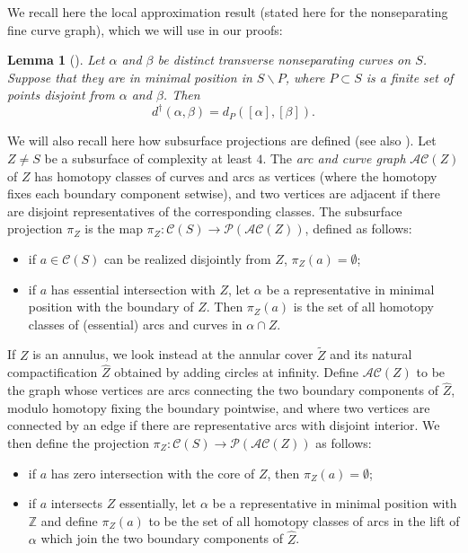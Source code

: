 \documentclass{amsart}
\newcommand{\Z}{\mathbb{Z}}
\newcommand{\C}{\mathcal{C}}
\newcommand{\ssm}{\smallsetminus}
\newcommand{\dist}{d}
\newcommand{\distdagger}{d^\dagger}
\newcommand{\AC}{\mathcal{AC}}
\newtheorem{lemma}[thm]{Lemma}
\theoremstyle{definition}
\begin{document}
We recall here the local approximation result \cite[Lemma 3.4]{bhw_quasi} (stated here for the nonseparating fine curve graph), which we will use in our proofs:

\begin{lemma}[\cite{bhw_quasi}]\label{lem:local-approximation} 
Let \(\alpha\) and \(\beta\) be distinct transverse nonseparating curves on \(S\). Suppose  that they are in minimal position in \(S\ssm P\), where \(P\subset S\) is a finite set of points disjoint from \(\alpha\) and \(\beta\). Then
\[\distdagger(\alpha,\beta)=\dist_P([\alpha],[\beta]).\]
\end{lemma}

We will also recall here how subsurface projections are defined (see also \cite{mm_geometryII}). Let \(Z \neq S\) be a subsurface of complexity at least \(4\). The \emph{arc and curve graph} \(\AC(Z)\) of \(Z\) has homotopy classes of curves and arcs as vertices (where the homotopy fixes each boundary component setwise), and two vertices are adjacent if there are disjoint representatives of the corresponding classes. The subsurface projection \(\pi_Z\) is the map \(\pi_Z:\C(S)\to\mathcal{P}(\AC(Z))\), defined as follows:
\begin{itemize}
\item if \(a\in \C(S)\) can be realized disjointly from \(Z\), \(\pi_Z(a)=\emptyset\);
\item if \(a\) has essential intersection with \(Z\), let \(\alpha\) be a representative in minimal position with the boundary of \(Z\). Then \(\pi_Z(a)\) is the set of all homotopy classes of (essential) arcs and curves in \(\alpha\cap Z\).
\end{itemize}

If \(Z\) is an annulus, we look instead at the annular cover \(\tilde{Z}\) and its natural compactification \(\hat{Z}\) obtained by adding circles at infinity. Define \(\AC(Z)\) to be the graph whose vertices are arcs connecting the two boundary components of \(\hat{Z}\), modulo homotopy fixing the boundary pointwise, and where two vertices are connected by an edge if there are representative arcs with disjoint interior. We then define the projection \(\pi_Z:\C(S)\to\mathcal{P}(\AC(Z))\) as follows:
\begin{itemize}
\item if \(a\) has zero intersection with the core of \(Z\), then \(\pi_Z(a)=\emptyset\);
\item if \(a\) intersects \(Z\) essentially, let \(\alpha\) be a representative in minimal position with \(\Z\) and define \(\pi_Z(a)\) to be the set of all homotopy classes of arcs in the lift of \(\alpha\) which join the two boundary components of \(\hat{Z}\).
\end{itemize}
\end{document}

